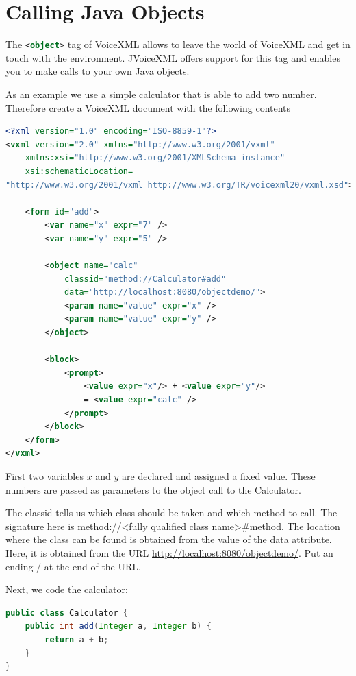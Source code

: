 \documentclass[11pt,a4paper]{book}
\begin{document}
\section{Calling Java Objects}

The \lstinline[language=XML]{<object>} tag of VoiceXML allows to leave the world
of VoiceXML and get in touch with the environment. JVoiceXML offers support for
this tag and enables you to make calls to your own Java objects.

As an example we use a simple calculator that is able to add two number.
Therefore create a VoiceXML document with the following contents

\begin{lstlisting}[language=XML]
<?xml version="1.0" encoding="ISO-8859-1"?>
<vxml version="2.0" xmlns="http://www.w3.org/2001/vxml"
    xmlns:xsi="http://www.w3.org/2001/XMLSchema-instance"
    xsi:schematicLocation=
"http://www.w3.org/2001/vxml http://www.w3.org/TR/voicexml20/vxml.xsd">

    <form id="add">
        <var name="x" expr="7" />
        <var name="y" expr="5" />

        <object name="calc"
            classid="method://Calculator#add"
            data="http://localhost:8080/objectdemo/">
            <param name="value" expr="x" />
            <param name="value" expr="y" />
        </object>

        <block>
            <prompt>
                <value expr="x"/> + <value expr="y"/>
                = <value expr="calc" />
            </prompt>
        </block>
    </form>
</vxml>
\end{lstlisting}

First two variables $x$ and $y$ are declared and assigned a fixed value. These
numbers are passed as parameters to the object call to the Calculator.

The classid tells us which class should be taken and which method to call. The
signature here is \url{method://<fully qualified class name>#method}.
The location where the class can be found is obtained from the value of the data
attribute. Here, it is obtained from the URL
\url{http://localhost:8080/objectdemo/}. Put an ending / at the end
of the URL.

Next, we code the calculator:
\begin{lstlisting}[language=Java]
public class Calculator {
    public int add(Integer a, Integer b) {
        return a + b;
    }
}
\end{lstlisting}
\end{document}

